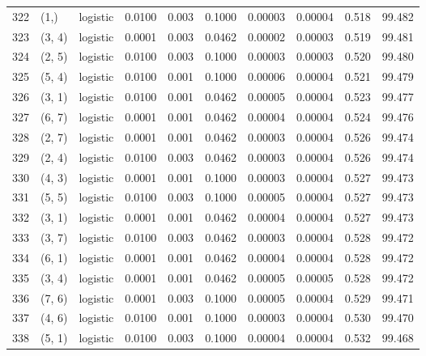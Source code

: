 \begin{tabular}{lllrrrrrrr}
322 &        (1,) &  logistic &  0.0100 &  0.003 &  0.1000 &          0.00003 &    0.00004 &       0.518 &    99.482 \\
323 &      (3, 4) &  logistic &  0.0001 &  0.003 &  0.0462 &          0.00002 &    0.00003 &       0.519 &    99.481 \\
324 &      (2, 5) &  logistic &  0.0100 &  0.003 &  0.1000 &          0.00003 &    0.00003 &       0.520 &    99.480 \\
325 &      (5, 4) &  logistic &  0.0100 &  0.001 &  0.1000 &          0.00006 &    0.00004 &       0.521 &    99.479 \\
326 &      (3, 1) &  logistic &  0.0100 &  0.001 &  0.0462 &          0.00005 &    0.00004 &       0.523 &    99.477 \\
327 &      (6, 7) &  logistic &  0.0001 &  0.001 &  0.0462 &          0.00004 &    0.00004 &       0.524 &    99.476 \\
328 &      (2, 7) &  logistic &  0.0001 &  0.001 &  0.0462 &          0.00003 &    0.00004 &       0.526 &    99.474 \\
329 &      (2, 4) &  logistic &  0.0100 &  0.003 &  0.0462 &          0.00003 &    0.00004 &       0.526 &    99.474 \\
330 &      (4, 3) &  logistic &  0.0001 &  0.001 &  0.1000 &          0.00003 &    0.00004 &       0.527 &    99.473 \\
331 &      (5, 5) &  logistic &  0.0100 &  0.003 &  0.1000 &          0.00005 &    0.00004 &       0.527 &    99.473 \\
332 &      (3, 1) &  logistic &  0.0001 &  0.001 &  0.0462 &          0.00004 &    0.00004 &       0.527 &    99.473 \\
333 &      (3, 7) &  logistic &  0.0100 &  0.003 &  0.0462 &          0.00003 &    0.00004 &       0.528 &    99.472 \\
334 &      (6, 1) &  logistic &  0.0001 &  0.001 &  0.0462 &          0.00004 &    0.00004 &       0.528 &    99.472 \\
335 &      (3, 4) &  logistic &  0.0001 &  0.001 &  0.0462 &          0.00005 &    0.00005 &       0.528 &    99.472 \\
336 &      (7, 6) &  logistic &  0.0001 &  0.003 &  0.1000 &          0.00005 &    0.00004 &       0.529 &    99.471 \\
337 &      (4, 6) &  logistic &  0.0100 &  0.001 &  0.1000 &          0.00003 &    0.00004 &       0.530 &    99.470 \\
338 &      (5, 1) &  logistic &  0.0100 &  0.003 &  0.1000 &          0.00004 &    0.00004 &       0.532 &    99.468 \\

\end{tabular}
